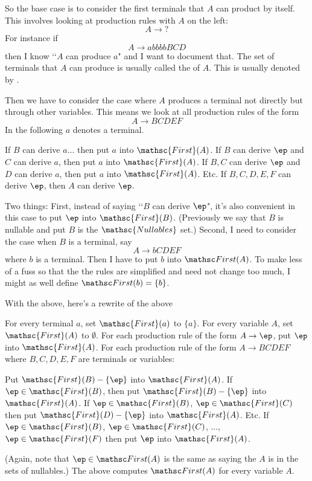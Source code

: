 So the base case is to consider the first terminals that $A$ can product
by itself. This involves looking at production rules with $A$ on the left:
\[
A \rightarrow ?
\]
For instance if
\[
A \rightarrow abbbbBCD
\]
then I know \lq\lq $A$ can produce $a$" and I want to document that.
The set of terminals that $A$ can produce is usually called the
 of $A$.
This is usually denoted by
.

Then we have to consider the case where $A$ produces a terminal not
directly but through other variables.
This means we look at all production rules of the form
\[
A \rightarrow BCDEF
\]
In the following $a$ denotes a terminal.
\begin{enumerate}[nosep]
  \li If $B$ can derive $a...$ then put $a$ into $\mathsc{First}(A)$.
  \li If $B$ can derive $\ep$ and $C$ can derive $a$, then put $a$ into
  $\mathsc{First}(A)$.
  \li If $B,C$ can derive $\ep$ and $D$ can derive $a$, then put $a$ into
  $\mathsc{First}(A)$.
  \li Etc.
  \li If $B,C,D,E,F$ can derive $\ep$, then $A$ can derive $\ep$.
\end{enumerate}
Two things: First, instead of saying \lq\lq $B$ can derive $\ep$", it's also
convenient in this case to put $\ep$ into
$\mathsc{First}(B)$.
(Previously we say that $B$ is nullable and put $B$ is the
$\mathsc{Nullables}$ set.)
Second, I need to consider the case when $B$ is a terminal, say
\[
A \rightarrow bCDEF
\]
where $b$ is a terminal. Then I have to put $b$ into $\FIRST(A)$.
To make less of a fuss so that the the rules are simplified and need not
change too much,
I might as well define $\FIRST(b) = \{b\}$.

With the above, here's a rewrite of the above
\begin{enumerate}[nosep]
  \li For every terminal $a$, set $\mathsc{First}(a)$ to $\{a\}$.
  \li For every variable $A$, set $\mathsc{First}(A)$ to $\emptyset$.
  \li For each production rule of the form $A \rightarrow \ep$,
  put $\ep$ into $\mathsc{First}(A)$.
  \li For each production rule of the form $A \rightarrow BCDEF$ where
  $B,C,D,E,F$ are terminals or variables:
  \begin{enumerate}[nosep]
    \li Put $\mathsc{First}(B) - \{ \ep \}$ into $\mathsc{First}(A)$.
    \li If
    $\ep \in \mathsc{First}(B)$, then put
    $\mathsc{First}(B) - \{ \ep \}$ into $\mathsc{First}(A)$.
    \li
    If
    $\ep \in \mathsc{First}(B)$,
    $\ep \in \mathsc{First}(C)$ then put
    $\mathsc{First}(D) - \{ \ep \}$ into $\mathsc{First}(A)$.
    \li Etc.
    \li If
    $\ep \in \mathsc{First}(B)$,
    $\ep \in \mathsc{First}(C)$, ...,
    $\ep \in \mathsc{First}(F)$ then put
    $\ep$ into $\mathsc{First}(A)$.
  \end{enumerate}
\end{enumerate}
(Again, note that $\ep \in \FIRST(A)$ is the same as saying the $A$ is
in the sets of nullables.)
The above computes $\FIRST(A)$ for every variable $A$.


